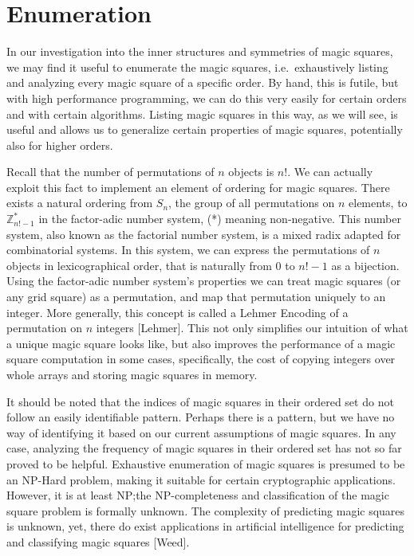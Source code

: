 \documentclass[12pt]{report}
\begin{document}
\section{Enumeration}

\par In our investigation into the inner structures and symmetries of magic squares, we may find it
useful to enumerate the magic squares, i.e.\ exhaustively listing and analyzing every magic square
of a specific order. By hand, this is futile, but with high performance programming, we can do this
very easily for certain orders and with certain algorithms. Listing magic squares in this way, as
we will see, is useful and allows us to generalize certain properties of magic squares, potentially
also for higher orders.

\par Recall that the number of permutations of $n$ objects is $n$!. We can actually exploit this
fact to implement an element of ordering for magic squares. There exists a natural ordering from
$S_n$, the group of all permutations on $n$ elements, to $\mathbb{Z}^{*}_{n!-1}$  in the
factor-adic number system, (*) meaning non-negative. This number system, also known as the
factorial number system, is a mixed radix adapted for combinatorial systems. In this system, we can
express the permutations of $n$ objects in lexicographical order, that is naturally from $0$ to
$n!-1$ as a bijection. Using the factor-adic number system's properties we can treat magic squares
(or any grid square) as a permutation, and map that permutation uniquely to an integer. More
generally, this concept is called a Lehmer Encoding of a permutation on $n$ integers [Lehmer]. This
not only simplifies our intuition of what a unique magic square looks like, but also improves the
performance of a magic square computation in some cases, specifically, the cost of copying integers
over whole arrays and storing magic squares in memory.

\par It should be noted that the indices of magic squares in their ordered set do not follow an
easily identifiable pattern. Perhaps there is a pattern, but we have no way of identifying it based
on our current assumptions of magic squares. In any case, analyzing the frequency of magic squares
in their ordered set has not so far proved to be helpful. Exhaustive enumeration of magic squares
is presumed to be an NP-Hard problem, making it suitable for certain cryptographic applications.
However, it is at least NP;\@ the NP-completeness and classification of the magic square problem is
formally unknown. The complexity of predicting magic squares is unknown, yet, there do exist
applications in artificial intelligence for predicting and classifying magic squares [Weed].
\end{document}
